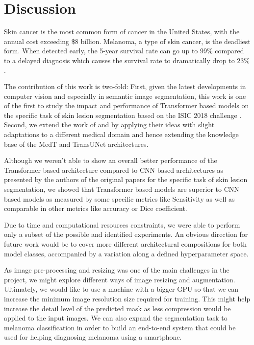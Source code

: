 \section{Discussion}

Skin cancer is the most common form of cancer in the United States, with the annual cost exceeding \$8 billion. Melanoma, a type of skin cancer, is the deadliest form. When detected early, the 5-year survival rate can go up to 99\% compared to a delayed diagnosis which causes the survival rate to dramatically drop to 23\% \citep{challenge-2018-codella}.

\par
The contribution of this work is two-fold: First, given the latest developments in computer vision and especially in semantic image segmentation, this work is one of the first to study the impact and performance of Transformer based models \citep{transformers-2020-dosovitskiy} on the specific task of skin lesion segmentation based on the ISIC 2018 challenge \citep{isic-2018-segmentation}. Second, we extend the work of \citep{medical_transformer-2021-valanarasu} and \citep{transunet-2021-chen} by applying their ideas with slight adaptations to a different medical domain and hence extending the knowledge base of the MedT and TransUNet architectures.

\par
Although we weren’t able to show an overall better performance of the Transformer based architecture compared to CNN based architectures as presented by the authors of the original papers for the specific task of skin lesion segmentation, we showed that Transformer based models are superior to CNN based models as measured by some specific metrics like Sensitivity as well as comparable in other metrics like accuracy or Dice coefficient.

\par
Due to time and computational resources constraints, we were able to perform only a subset of the possible and identified experiments. An obvious direction for future work would be to cover more different architectural compositions for both model classes, accompanied by a variation along a defined  hyperparameter space.

\par
As image pre-processing and resizing was one of the main challenges in the project, we might explore different ways of image resizing and augmentation. Ultimately, we would like to use a machine with a bigger GPU so that we can increase the minimum image resolution size required for training. This might help increase the detail level of the predicted mask as less compression would be applied to the input images. We can also expand the segmentation task to melanoma classification in order to build an end-to-end system that could be used for helping diagnosing melanoma using a smartphone.


